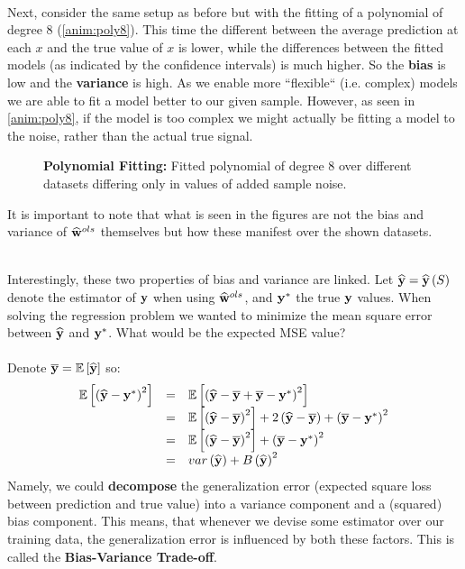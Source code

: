 ~\\Next, consider the same setup as before but with the fitting of a polynomial of degree $8$ (\autoref{anim:poly8}). This time the different between the average prediction at each $x$ and the true value of $x$ is lower, while the differences between the fitted models (as indicated by the confidence intervals) is much higher. So the \textbf{bias} is low and the \textbf{variance} is high. As we enable more ``flexible`` (i.e. complex) models we are able to fit a model better to our given sample. However, as seen in \autoref{anim:poly8}, if the model is too complex we might actually be fitting a model to the noise, rather than the actual true signal. 
\begin{figure}[h!]
	\centering
	\caption{\textbf{Polynomial Fitting:} Fitted polynomial of degree $8$ over different datasets differing only in values of added sample noise. \GitChapterTwoExamples}\label{anim:poly8}
\end{figure}

\begin{remark}
It is important to note that what is seen in the figures are not the bias and variance of $\widehat{\mathbf{w}}^{ols}$ themselves but how these manifest over the shown datasets. 
\end{remark}
~\\
Interestingly, these two properties of bias and variance are linked. Let $\widehat{\mathbf{y}}=\widehat{\mathbf{y}}\left(S\right)$ denote the estimator of $\mathbf{y}$ when using $\widehat{\mathbf{w}}^{ols}$, and $\mathbf{y}^*$ the true $\mathbf{y}$ values. When solving the regression problem we wanted to minimize the mean square error between $\widehat{\mathbf{y}}$ and $\mathbf{y}^*$. What would be the expected MSE value?
\\~\\
Denote $\overline{\mathbf{y}}=\mathbb{E}\left[\widehat{\mathbf{y}}\right]$ so:
$$
\begin{array}{ccl}
\mathbb{E}\left[\left(\widehat{\mathbf{y}}-\mathbf{y}^*\right)^2\right] & = & \mathbb{E}\left[\left(\widehat{\mathbf{y}} - \overline{\mathbf{y}} + \overline{\mathbf{y}} -\mathbf{y}^*\right)^2\right] \\
& = & \mathbb{E}\left[\left(\widehat{\mathbf{y}}-\overline{\mathbf{y}}\right)^2\right] + 2\left(\widehat{\mathbf{y}}-\overline{\mathbf{y}}\right)+\left(\overline{\mathbf{y}}-\mathbf{y}^*\right)^2\\
& = & \mathbb{E}\left[\left(\widehat{\mathbf{y}}-\overline{\mathbf{y}}\right)^2\right] + \left(\overline{\mathbf{y}}-\mathbf{y}^*\right)^2\\
& = & var\left(\widehat{\mathbf{y}}\right) + B\left(\widehat{\mathbf{y}}\right)^2
\end{array}
$$
Namely, we could \textbf{decompose} the generalization error (expected square loss between prediction and true value) into a variance component and a (squared) bias component. This means, that whenever we devise some estimator over our training data, the generalization error is influenced by both these factors. This is called the \textbf{Bias-Variance Trade-off}.

